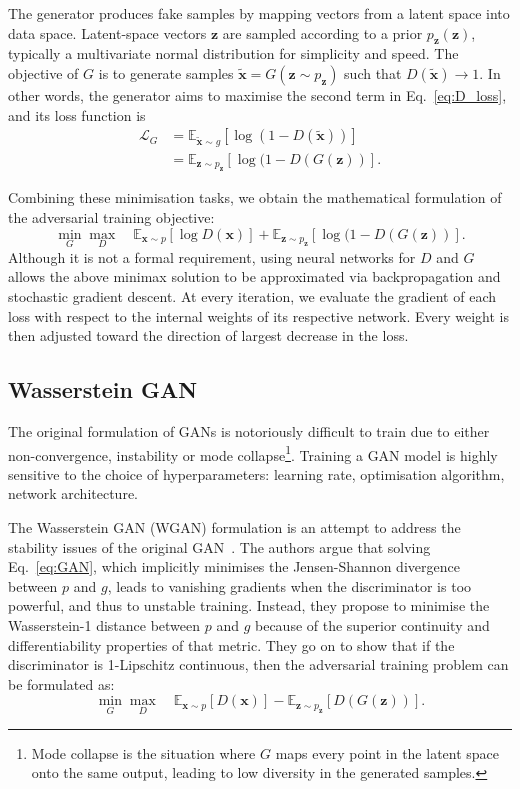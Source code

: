 The generator produces fake samples by mapping vectors from a latent space into
data space. Latent-space vectors $\bm{z}$ are sampled according to a prior
$p_{\bm{z}}(\bm{z})$, typically a multivariate normal distribution for
simplicity and speed. The objective of $G$ is to generate samples
$\tilde{\bm{x}} = G(\bm{z} \sim p_{\bm{z}})$ such that
$D(\tilde{\bm{x}}) \rightarrow 1$. In other words, the generator aims to
maximise the second term in Eq.~\ref{eq:D_loss}, and its loss function is
\begin{align}\label{eq:GAN_gen}
    \mathcal{L}_G & =
    \mathbb{E}_{\tilde{\bm{x}} \sim g} [ \log( 1 - D(\tilde{\bm{x}}) )]\nonumber        \\
                  & = \mathbb{E}_{\bm{z} \sim p_{\bm{z}}} [ \log( 1 - D(G(\bm{z}) )].
\end{align}

Combining these minimisation tasks, we obtain the mathematical formulation of
the adversarial training objective:
\begin{equation}\label{eq:GAN}
    \min_G \max_D \quad
    \mathbb{E}_{\bm{x} \sim p} [ \log D(\bm{x}) ] +
    \mathbb{E}_{\bm{z} \sim p_{\bm{z}}} [ \log( 1 - D(G(\bm{z}) )].
\end{equation}
Although it is not a formal requirement, using neural networks for $D$ and $G$
allows the above minimax solution to be approximated via backpropagation and
stochastic gradient descent. At every iteration, we evaluate the gradient of
each loss with respect to the internal weights of its respective network. Every
weight is then adjusted toward the direction of largest decrease in the loss.


\subsection{Wasserstein GAN}
The original formulation of GANs is notoriously difficult to train due to either
non-convergence, instability or mode collapse\footnote{Mode collapse is the
situation where $G$ maps every point in the latent space onto the same output,
leading to low diversity in the generated samples.}. Training a GAN model is
highly sensitive to the choice of hyperparameters: learning rate, optimisation
algorithm, network architecture.

The Wasserstein GAN (WGAN) formulation is an attempt to address the stability
issues of the original GAN~\cite{arjovsky2017wasserstein}. The authors argue
that solving Eq.~\ref{eq:GAN}, which implicitly minimises the Jensen-Shannon
divergence between $p$ and $g$, leads to vanishing gradients when the
discriminator is too powerful, and thus to unstable training. Instead, they
propose to minimise the Wasserstein-1 distance between $p$ and $g$ because of
the superior continuity and differentiability properties of that metric. They go on to show
that if the discriminator is 1-Lipschitz continuous, then the adversarial
training problem can be formulated as:
\begin{equation}
    \min_G \max_D \quad
    \mathbb{E}_{\bm{x} \sim p} \left[ D(\bm{x}) \right] -
    \mathbb{E}_{\bm{z} \sim p_{\bm{z}}} \left[ D(G(\bm{z})) \right].
\end{equation}

